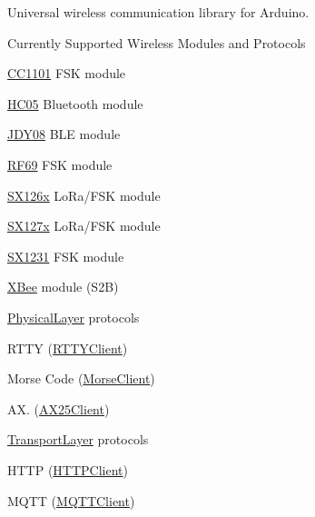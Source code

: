 Universal wireless communication library for Arduino.

\begin{DoxyParagraph}{Currently Supported Wireless Modules and Protocols}

\begin{DoxyItemize}
\item \mbox{\hyperlink{class_c_c1101}{C\+C1101}} F\+SK module
\item \mbox{\hyperlink{class_h_c05}{H\+C05}} Bluetooth module
\item \mbox{\hyperlink{class_j_d_y08}{J\+D\+Y08}} B\+LE module
\item \mbox{\hyperlink{class_r_f69}{R\+F69}} F\+SK module
\item \mbox{\hyperlink{class_s_x126x}{S\+X126x}} Lo\+Ra/\+F\+SK module
\item \mbox{\hyperlink{class_s_x127x}{S\+X127x}} Lo\+Ra/\+F\+SK module
\item \mbox{\hyperlink{class_s_x1231}{S\+X1231}} F\+SK module
\item \mbox{\hyperlink{class_x_bee}{X\+Bee}} module (S2B)
\item \mbox{\hyperlink{class_physical_layer}{Physical\+Layer}} protocols
\begin{DoxyItemize}
\item R\+T\+TY (\mbox{\hyperlink{class_r_t_t_y_client}{R\+T\+T\+Y\+Client}})
\item Morse Code (\mbox{\hyperlink{class_morse_client}{Morse\+Client}})
\item A\+X. (\mbox{\hyperlink{class_a_x25_client}{A\+X25\+Client}})
\end{DoxyItemize}
\item \mbox{\hyperlink{class_transport_layer}{Transport\+Layer}} protocols
\begin{DoxyItemize}
\item H\+T\+TP (\mbox{\hyperlink{class_h_t_t_p_client}{H\+T\+T\+P\+Client}})
\item M\+Q\+TT (\mbox{\hyperlink{class_m_q_t_t_client}{M\+Q\+T\+T\+Client}})
\end{DoxyItemize}
\end{DoxyItemize}
\end{DoxyParagraph}

